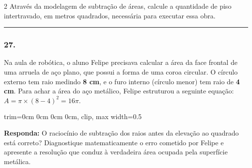 \documentclass[twoside, 10pt, a4paper]{article}
\newlength{\espacoPreQuestao}\setlength{\espacoPreQuestao}{0.1cm}
\newlength{\espacoQuestao}\setlength{\espacoQuestao}{0.2cm}
\begin{document}
\begin{multicols*}{2}
Através da modelagem de subtração de áreas, calcule a quantidade de piso intertravado, em metros quadrados, necessária para executar essa obra.
\par\vspace{\espacoQuestao}

\noindent\textcolor{CorLinha}{\rule{\linewidth}{0.5pt}} 
\par\vspace{\espacoPreQuestao}
\subsubsection*{27.} Na aula de robótica, o aluno Felipe precisava calcular a área da face frontal de uma arruela de aço plano, que possui a forma de uma coroa circular. O círculo externo tem raio medindo \textbf{8 cm}, e o furo interno (círculo menor) tem raio de \textbf{4 cm}. Para achar a área do aço metálico, Felipe estruturou a seguinte equação: $ A = \pi \times (8 - 4)^2 = 16\pi $.

\begin{center}
\begin{adjustbox}{trim=0cm 0cm 0cm 0cm, clip, max width=0.5\linewidth}
\end{adjustbox}
\end{center}

\begin{boxresponda}
\textbf{Responda:} O raciocínio de subtração dos raios antes da elevação ao quadrado está correto? Diagnostique matematicamente o erro cometido por Felipe e apresente a resolução que conduz à verdadeira área ocupada pela superfície metálica.
\end{boxresponda}
\par\vspace{\espacoQuestao}


\end{multicols*}
\end{document}
